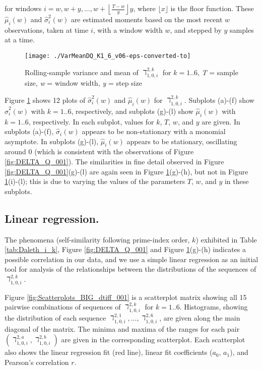 \documentclass[12pt,longtitle,times]{amsart}
\begin{document}
for windows $i=w,w+y,\dots,w+\left\lfloor{}\frac{T-w}{y}\right\rfloor{}y$, where $\lfloor{}x\rfloor{}$ is the floor function. These $\hat{\mu}_i(w)$ and $\hat{\sigma}_i^2(w)$ are estimated moments based on the most recent $w$ observations, taken at time $i$, with a window width $w$, and stepped by $y$ samples at a time.

\begin{figure}[hp]
\centering
\texttt{[image: ./VarMeanDQ\_K1\_6\_v06-eps-converted-to]}
\caption{Rolling-sample variance and mean of $\daleth_{1,0,i}^{2,k}$ for $k=1..6$, \textit{T} = sample size, \textit{w} = window width, \textit{y} = step size}
\label{fig:VarMeanDQ_K1_6_v02}
\end{figure}

Figure \ref{fig:VarMeanDQ_K1_6_v02} shows 12 plots of $\hat{\sigma}_i^2(w)$ and $\hat{\mu}_i(w)$ for $\daleth_{1,0,i}^{2,k}$. Subplots (a)-(f) show $\hat{\sigma}_i^2(w)$ with $k=1..6$, respectively, and subplots (g)-(l) show $\hat{\mu}_i(w)$ with $k=1..6$, respectively. In each subplot, values for $k$, $T$, $w$, and $y$ are given.  In subplots (a)-(f), $\hat{\sigma}_i(w)$ appears to be non-stationary with a monomial asymptote. In subplots (g)-(l), $\hat{\mu}_i(w)$ appears to be stationary, oscillating around $0$ (which is consistent with the observations of Figure \ref{fig:DELTA_Q_001}). The similarities in fine detail observed in Figure \ref{fig:DELTA_Q_001}(g)-(l) are again seen in Figure \ref{fig:VarMeanDQ_K1_6_v02}(g)-(h), but not in Figure \ref{fig:VarMeanDQ_K1_6_v02}(i)-(l); this is due to varying the values of the parameters $T$, $w$, and $y$ in these subplots.

\subsection[short]{Linear regression.} The phenomena (self-similarity following prime-index order, $k$) exhibited in Table \ref{tab:Daleth_i_k}, Figure \ref{fig:DELTA_Q_001} and Figure \ref{fig:VarMeanDQ_K1_6_v02}(g)-(h) indicates a possible correlation in our data, and we use a simple linear regression as an initial tool for analysis of the relationships between the distributions of the sequences of $\daleth_{1,0,i}^{2,k}$. 

Figure \ref{fig:Scatterplots_BIG_dtiff_001} is a scatterplot matrix showing all 15 pairwise combinations of sequences of $\daleth_{1,0,i}^{2,k}$ for $k=1..6$. Histograms, showing the distribution of each sequence $\daleth_{1,0,i}^{2,1},\dots,\daleth_{1,0,i}^{2,6}$, are given along the main diagonal of the matrix. The minima and maxima of the ranges for each pair $(\daleth_{1,0,i}^{2,a},\daleth_{1,0,i}^{2,b})$ are given in the corresponding scatterplot. Each scatterplot also shows the linear regression fit (red line), linear fit coefficients ($a_0$, $a_1$), and Pearson's correlation $r$.
\end{document}
